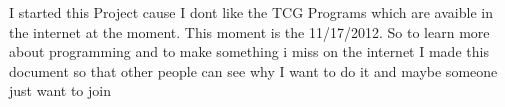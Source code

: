 I started this Project cause I dont like the TCG Programs which are avaible in the internet at the moment. This moment is the 11/17/2012. So to learn more about programming and to make something i miss on the internet I made this document so that other people can see why I want to do it and maybe someone just want to join

